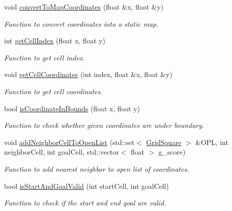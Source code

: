 \begin{DoxyCompactItemize}
void \hyperlink{classastar__plugin_1_1_a_star_planner_ac43f501b17770643240a6e36174a73b9}{convert\+To\+Map\+Coordinates} (float \&x, float \&y)
\begin{DoxyCompactList}\small\item\em Function to convert coordinates into a static map. \end{DoxyCompactList}\item 
int \hyperlink{classastar__plugin_1_1_a_star_planner_aae9903fa7f48e8e1ce45f4c772989e95}{get\+Cell\+Index} (float x, float y)
\begin{DoxyCompactList}\small\item\em Function to get cell index. \end{DoxyCompactList}\item 
void \hyperlink{classastar__plugin_1_1_a_star_planner_add9c03d5a079ad44e5f91ccc8344679d}{get\+Cell\+Coordinates} (int index, float \&x, float \&y)
\begin{DoxyCompactList}\small\item\em Function to get cell coordinates. \end{DoxyCompactList}\item 
bool \hyperlink{classastar__plugin_1_1_a_star_planner_a3e3717511d9000f1c55f3f57a58dfd0f}{is\+Coordinate\+In\+Bounds} (float x, float y)
\begin{DoxyCompactList}\small\item\em Function to check whether given coordinates are under boundary. \end{DoxyCompactList}\item 
void \hyperlink{classastar__plugin_1_1_a_star_planner_a2d44c51604b31cd5f7e8599520ae3645}{add\+Neighbor\+Cell\+To\+Open\+List} (std\+::set$<$ \hyperlink{class_grid_square}{Grid\+Square} $>$ \&O\+PL, int neighbor\+Cell, int goal\+Cell, std\+::vector$<$ float $>$ g\+\_\+score)
\begin{DoxyCompactList}\small\item\em Function to add nearest neighbor to open list of coordinates. \end{DoxyCompactList}\item 
bool \hyperlink{classastar__plugin_1_1_a_star_planner_a755e2c8b550458a1c4640a86fca1d993}{is\+Start\+And\+Goal\+Valid} (int start\+Cell, int goal\+Cell)
\begin{DoxyCompactList}\small\item\em Function to check if the start and end goal are valid. \end{DoxyCompactList}\end{DoxyCompactItemize}
